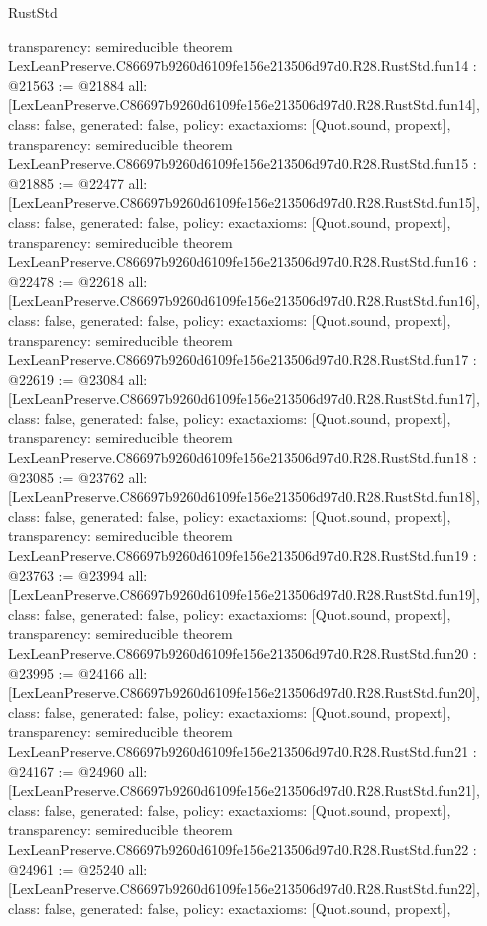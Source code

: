 \begin{lexlean}{RustStd}
\begin{coremodule}
{  transparency: semireducible
}
theorem LexLeanPreserve.C86697b9260d6109fe156e213506d97d0.R28.RustStd.fun14 : @21563 := @21884 {
  all: [LexLeanPreserve.C86697b9260d6109fe156e213506d97d0.R28.RustStd.fun14],
  class: false,
  generated: false,
  policy: exact{axioms: [Quot.sound, propext]},
  transparency: semireducible
}
theorem LexLeanPreserve.C86697b9260d6109fe156e213506d97d0.R28.RustStd.fun15 : @21885 := @22477 {
  all: [LexLeanPreserve.C86697b9260d6109fe156e213506d97d0.R28.RustStd.fun15],
  class: false,
  generated: false,
  policy: exact{axioms: [Quot.sound, propext]},
  transparency: semireducible
}
theorem LexLeanPreserve.C86697b9260d6109fe156e213506d97d0.R28.RustStd.fun16 : @22478 := @22618 {
  all: [LexLeanPreserve.C86697b9260d6109fe156e213506d97d0.R28.RustStd.fun16],
  class: false,
  generated: false,
  policy: exact{axioms: [Quot.sound, propext]},
  transparency: semireducible
}
theorem LexLeanPreserve.C86697b9260d6109fe156e213506d97d0.R28.RustStd.fun17 : @22619 := @23084 {
  all: [LexLeanPreserve.C86697b9260d6109fe156e213506d97d0.R28.RustStd.fun17],
  class: false,
  generated: false,
  policy: exact{axioms: [Quot.sound, propext]},
  transparency: semireducible
}
theorem LexLeanPreserve.C86697b9260d6109fe156e213506d97d0.R28.RustStd.fun18 : @23085 := @23762 {
  all: [LexLeanPreserve.C86697b9260d6109fe156e213506d97d0.R28.RustStd.fun18],
  class: false,
  generated: false,
  policy: exact{axioms: [Quot.sound, propext]},
  transparency: semireducible
}
theorem LexLeanPreserve.C86697b9260d6109fe156e213506d97d0.R28.RustStd.fun19 : @23763 := @23994 {
  all: [LexLeanPreserve.C86697b9260d6109fe156e213506d97d0.R28.RustStd.fun19],
  class: false,
  generated: false,
  policy: exact{axioms: [Quot.sound, propext]},
  transparency: semireducible
}
theorem LexLeanPreserve.C86697b9260d6109fe156e213506d97d0.R28.RustStd.fun20 : @23995 := @24166 {
  all: [LexLeanPreserve.C86697b9260d6109fe156e213506d97d0.R28.RustStd.fun20],
  class: false,
  generated: false,
  policy: exact{axioms: [Quot.sound, propext]},
  transparency: semireducible
}
theorem LexLeanPreserve.C86697b9260d6109fe156e213506d97d0.R28.RustStd.fun21 : @24167 := @24960 {
  all: [LexLeanPreserve.C86697b9260d6109fe156e213506d97d0.R28.RustStd.fun21],
  class: false,
  generated: false,
  policy: exact{axioms: [Quot.sound, propext]},
  transparency: semireducible
}
theorem LexLeanPreserve.C86697b9260d6109fe156e213506d97d0.R28.RustStd.fun22 : @24961 := @25240 {
  all: [LexLeanPreserve.C86697b9260d6109fe156e213506d97d0.R28.RustStd.fun22],
  class: false,
  generated: false,
  policy: exact{axioms: [Quot.sound, propext]},
}
\end{coremodule}
\end{lexlean}
